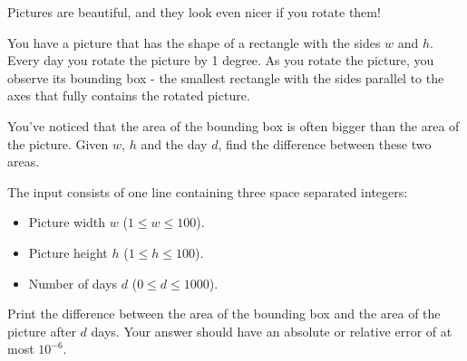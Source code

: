 \problemname{\problemyamlname}


\newcommand{\mina}{1}
\newcommand{\maxa}{100}
\newcommand{\minn}{0}
\newcommand{\maxn}{1000}

Pictures are beautiful, and they look even nicer if you rotate them!

You have a picture that has the shape of a rectangle with the sides $w$ and $h$. Every day you rotate the picture by 1 degree. As you rotate the picture, you observe its bounding box - the smallest rectangle with the sides parallel to the axes that fully contains the rotated picture.

You've noticed that the area of the bounding box is often bigger than the area of the picture. Given $w$, $h$ and the day $d$, find the difference between these two areas.

\begin{Input}
    The input consists of one line containing three space separated integers:
    \begin{itemize}
        \item Picture width $w$ ($\mina \leq w\leq \maxa$).
        \item Picture height $h$ ($\mina \leq h\leq \maxa$).
        \item Number of days $d$ ($\minn \leq d\leq \maxn$).
    \end{itemize}
\end{Input}

\begin{Output}
    Print the difference between the area of the bounding box and the area of the picture after $d$ days.
    Your answer should have an absolute or relative error of at most $10^{-6}$.
\end{Output}
